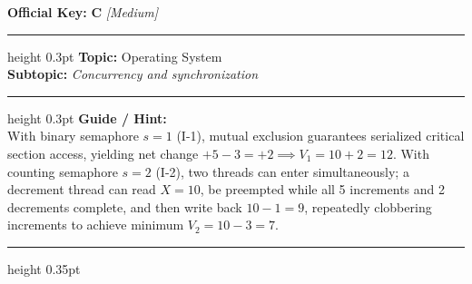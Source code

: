 \documentclass[a4paper,10pt]{article}
\begin{document}
\begin{tcolorbox}
\textbf{Official Key:} \textbf{\large C} \hfill \textit{\small [Medium]}
\vspace{2pt}\hrule height 0.3pt\vspace{3pt}
\textbf{Topic:} Operating System \\
\textbf{Subtopic:} \textit{Concurrency and synchronization}
\vspace{2pt}\hrule height 0.3pt\vspace{3pt}
\textbf{Guide / Hint:} \\
{\small With binary semaphore $s=1$ (I-1), mutual exclusion guarantees serialized critical section access, yielding net change $+5 - 3 = +2 \implies V_1 = 10 + 2 = 12$. With counting semaphore $s=2$ (I-2), two threads can enter simultaneously; a decrement thread can read $X=10$, be preempted while all 5 increments and 2 decrements complete, and then write back $10-1 = 9$, repeatedly clobbering increments to achieve minimum $V_2 = 10 - 3 = 7$.}

\end{tcolorbox}
\vspace{6pt}\hrule height 0.35pt\vspace{6pt}
\noindent
\end{document}
